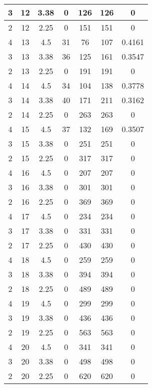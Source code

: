 \documentclass[letterpaper, 12pt]{article}
\begin{document}
\begin{longtable}{|c|c|c|c|c|c|c|}
\hline
3 & 12 & 3.38 & 0 & 126 & 126 & 0 \\
\hline
2 & 12 & 2.25 & 0 & 151 & 151 & 0 \\
\hline
4 & 13 & 4.5 & 31 & 76 & 107 & 0.4161 \\
\hline
3 & 13 & 3.38 & 36 & 125 & 161 & 0.3547 \\
\hline
2 & 13 & 2.25 & 0 & 191 & 191 & 0 \\
\hline
4 & 14 & 4.5 & 34 & 104 & 138 & 0.3778 \\
\hline
3 & 14 & 3.38 & 40 & 171 & 211 & 0.3162 \\
\hline
2 & 14 & 2.25 & 0 & 263 & 263 & 0 \\
\hline
4 & 15 & 4.5 & 37 & 132 & 169 & 0.3507 \\
\hline
3 & 15 & 3.38 & 0 & 251 & 251 & 0 \\
\hline
2 & 15 & 2.25 & 0 & 317 & 317 & 0 \\
\hline
4 & 16 & 4.5 & 0 & 207 & 207 & 0 \\
\hline
3 & 16 & 3.38 & 0 & 301 & 301 & 0 \\
\hline
2 & 16 & 2.25 & 0 & 369 & 369 & 0 \\
\hline
4 & 17 & 4.5 & 0 & 234 & 234 & 0 \\
\hline
3 & 17 & 3.38 & 0 & 331 & 331 & 0 \\
\hline
2 & 17 & 2.25 & 0 & 430 & 430 & 0 \\
\hline
4 & 18 & 4.5 & 0 & 259 & 259 & 0 \\
\hline
3 & 18 & 3.38 & 0 & 394 & 394 & 0 \\
\hline
2 & 18 & 2.25 & 0 & 489 & 489 & 0 \\
\hline
4 & 19 & 4.5 & 0 & 299 & 299 & 0 \\
\hline
3 & 19 & 3.38 & 0 & 436 & 436 & 0 \\
\hline
2 & 19 & 2.25 & 0 & 563 & 563 & 0 \\
\hline
4 & 20 & 4.5 & 0 & 341 & 341 & 0 \\
\hline
3 & 20 & 3.38 & 0 & 498 & 498 & 0 \\
\hline
2 & 20 & 2.25 & 0 & 620 & 620 & 0 \\
\hline
\end{longtable}
\end{document}
